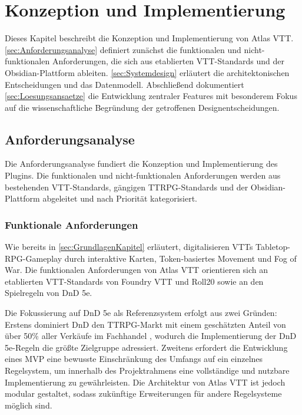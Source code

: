 \chapter{Konzeption und Implementierung}
\label{sec:KonzeptionImplementierung}

Dieses Kapitel beschreibt die Konzeption und Implementierung von Atlas \ac{VTT}. \autoref{sec:Anforderungsanalyse} definiert zunächst die funktionalen und nicht-funktionalen Anforderungen, die sich aus etablierten \ac{VTT}-Standards und der Obsidian-Plattform ableiten. \autoref{sec:Systemdesign} erläutert die architektonischen Entscheidungen und das Datenmodell. Abschließend dokumentiert \autoref{sec:Loesungsansaetze} die Entwicklung zentraler Features mit besonderem Fokus auf die wissenschaftliche Begründung der getroffenen Designentscheidungen.

\section{Anforderungsanalyse}
\label{sec:Anforderungsanalyse}

Die Anforderungsanalyse fundiert die Konzeption und Implementierung des Plugins. Die funktionalen und nicht-funktionalen Anforderungen werden aus bestehenden \ac{VTT}-Standards, gängigen \ac{TTRPG}-Standards und der Obsidian-Plattform abgeleitet und nach Priorität kategorisiert.

\subsection{Funktionale Anforderungen}

Wie bereits in \autoref{sec:GrundlagenKapitel} erläutert, digitalisieren \ac{VTT}s Tabletop-RPG-Gameplay durch interaktive Karten, Token-basiertes Movement und Fog of War. Die funktionalen Anforderungen von Atlas \ac{VTT} orientieren sich an etablierten \ac{VTT}-Standards von Foundry \ac{VTT} und Roll20 sowie an den Spielregeln von \ac{DnD} 5e.

Die Fokussierung auf \ac{DnD} 5e als Referenzsystem erfolgt aus zwei Gründen: Erstens dominiert \ac{DnD} den \ac{TTRPG}-Markt mit einem geschätzten Anteil von über 50\% aller Verkäufe im Fachhandel \autocite{RPGDrop2024Market}, wodurch die Implementierung der \ac{DnD} 5e-Regeln die größte Zielgruppe adressiert. Zweitens erfordert die Entwicklung eines \ac{MVP} eine bewusste Einschränkung des Umfangs auf ein einzelnes Regelsystem, um innerhalb des Projektrahmens eine vollständige und nutzbare Implementierung zu gewährleisten. Die Architektur von Atlas \ac{VTT} ist jedoch modular gestaltet, sodass zukünftige Erweiterungen für andere Regelsysteme möglich sind.


